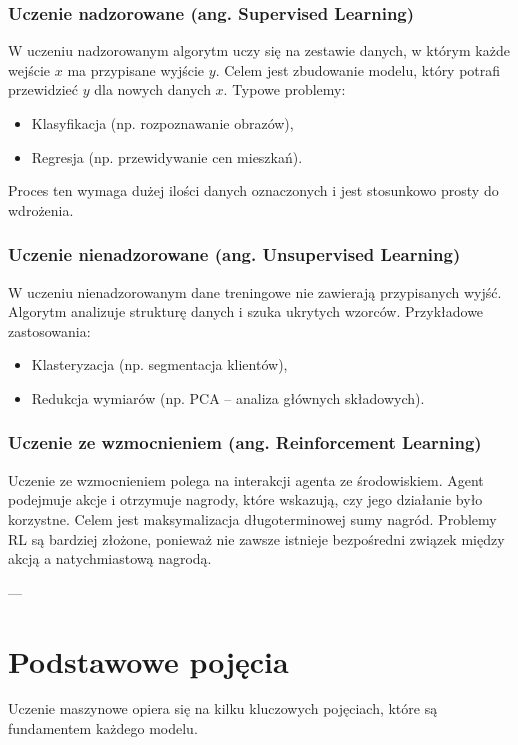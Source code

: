 \subsubsection{Uczenie nadzorowane (ang. Supervised Learning)}
W uczeniu nadzorowanym algorytm uczy się na zestawie danych, w którym każde wejście \( x \) ma przypisane wyjście \( y \). Celem jest zbudowanie modelu, który potrafi przewidzieć \( y \) dla nowych danych \( x \). Typowe problemy:
\begin{itemize}
	\item Klasyfikacja (np. rozpoznawanie obrazów),
	\item Regresja (np. przewidywanie cen mieszkań).
\end{itemize}
Proces ten wymaga dużej ilości danych oznaczonych i jest stosunkowo prosty do wdrożenia.

\subsubsection{Uczenie nienadzorowane (ang. Unsupervised Learning)}
W uczeniu nienadzorowanym dane treningowe nie zawierają przypisanych wyjść. Algorytm analizuje strukturę danych i szuka ukrytych wzorców. Przykładowe zastosowania:
\begin{itemize}
	\item Klasteryzacja (np. segmentacja klientów),
	\item Redukcja wymiarów (np. PCA – analiza głównych składowych).
\end{itemize}

\subsubsection{Uczenie ze wzmocnieniem (ang. Reinforcement Learning)}
Uczenie ze wzmocnieniem polega na interakcji agenta ze środowiskiem. Agent podejmuje akcje i otrzymuje nagrody, które wskazują, czy jego działanie było korzystne. Celem jest maksymalizacja długoterminowej sumy nagród. Problemy RL są bardziej złożone, ponieważ nie zawsze istnieje bezpośredni związek między akcją a natychmiastową nagrodą.

---

\section{Podstawowe pojęcia}

Uczenie maszynowe opiera się na kilku kluczowych pojęciach, które są fundamentem każdego modelu.

